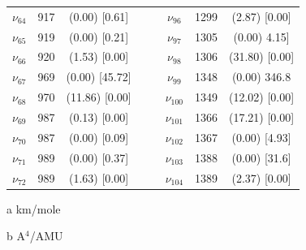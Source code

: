 \begin{table}[H]
\begin{center}
\begin{threeparttable}
\begin{tabular}{c c c c c c c c}
$\nu_{64}$&	917	&	(0.00)	[0.61]	&&&	$\nu_{96}$&	1299	&	(2.87)	[0.00]	\\
$\nu_{65}$&	919	&	(0.00)	[0.21]	&&&	$\nu_{97}$&	1305	&	(0.00)	4.15]	\\
$\nu_{66}$&	920	&	(1.53)	[0.00]	&&&	$\nu_{98}$&	1306	&	(31.80)	[0.00]	\\
$\nu_{67}$&	969	&	(0.00)	[45.72]	&&&	$\nu_{99}$&	1348	&	(0.00)	346.8	\\
$\nu_{68}$&	970	&	(11.86)	[0.00]	&&&	$\nu_{100}$	&	1349	&	(12.02)	[0.00]\\
$\nu_{69}$&	987	&	(0.13)	[0.00]	&&&	$\nu_{101}$&	1366	&	(17.21)	[0.00]	\\
$\nu_{70}$&	987	&	(0.00)	[0.09]	&&&	$\nu_{102}$	&	1367	&	(0.00)	[4.93]\\
$\nu_{71}$&	989	&	(0.00)	[0.37]	&&	&$\nu_{103}$	&	1388	&	(0.00)	[31.6]\\
$\nu_{72}$&	989	&	(1.63)	[0.00]	&&&	$\nu_{104}$&	1389	&	(2.37)	[0.00]	\\
	\bottomrule
\end{tabular}

	\begin{tablenotes}
		\item[a] km/mole
		\item[b] A$^{4}$/AMU
	\end{tablenotes}
\end{threeparttable}
\end{center}
\label{freq46-dmDibenfDi}
\end{table}



